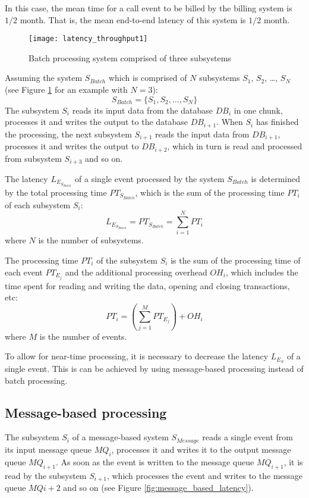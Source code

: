 In this case, the mean time for a call event to be billed by the billing system is $1/2$ month. That is, the mean end-to-end latency of this system is $1/2$ month.

\begin{figure}[htbp]
	\centering
	\texttt{[image: latency\_throughput1]}
	\caption{Batch processing system comprised of three subsystems}
	\label{fig:batch_processing_latency}
\end{figure}

Assuming the system $S_{Batch}$ which is comprised of $N$ subsystems $S_1$, $S_2$, \ldots, $S_N$ (see Figure \ref{fig:batch_processing_latency} for an example with $N=3$):
\begin{displaymath}
S_{Batch} = \{S_1, S_2, \ldots, S_N\}
\end{displaymath}
The subsystem $S_i$ reads its input data from the database $DB_i$ in one chunk, processes it and writes the output to the database $DB_{i+1}$. When $S_i$ has finished the processing, the next subsystem $S_{i+1}$ reads the input data from $DB_{i+1}$, processes it and writes the output to $DB_{i+2}$, which in turn is read and processed from subsystem $S_{i+3}$ and so on.

The latency $L_{E_{S_{Batch}}}$ of a single event processed by the system $S_{Batch}$ is determined by the total processing time $PT_{S_{Batch}}$, which is the sum of the processing time $PT_i$ of each subsystem $S_i$:
\begin{displaymath}
L_{E_{S_{Batch}}} = PT_{S_{Batch}} = \sum_{i=1}^N PT_i
\end{displaymath}
where $N$ is the number of subsystems.

The processing time $PT_i$ of the subsystem $S_i$ is the sum of the processing time of each event $PT_{E_{j}}$ and the additional processing overhead $OH_i$, which includes the time spent for reading and writing the data, opening and closing transactions, etc:
\begin{displaymath}
PT_i = \left(\sum_{j=1}^M PT_{E_{j}}\right) + OH_i
\end{displaymath}
where $M$ is the number of events.

To allow for near-time processing, it is necessary to decrease the latency $L_{E_S}$ of a single event. This is can be achieved by using message-based processing instead of batch processing.

\subsection{Message-based processing}
The subsystem $S_i$ of a message-based system $S_{Message}$ reads a single event from its input message queue $MQ_i$, processes it and writes it to the output message queue $MQ_{i+1}$. As soon as the event is written to the message queue $MQ_{i+1}$, it is read by the subsystem $S_{i+1}$, which processes the event and writes to the message queue $MQ{i+2}$ and so on (see Figure \ref{fig:message_based_latency}).

